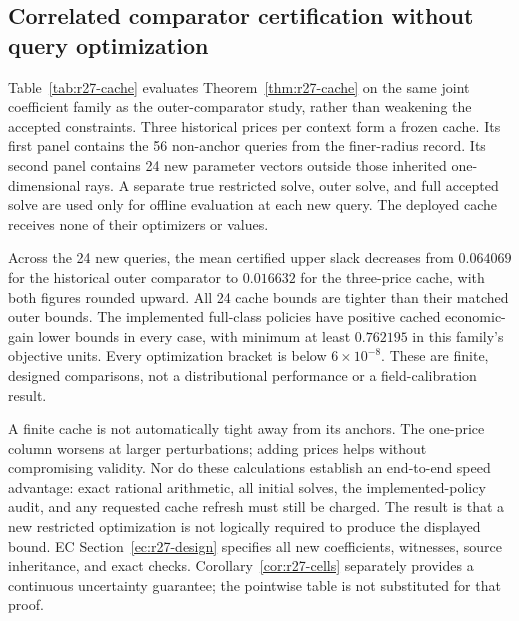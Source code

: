 \subsection{Correlated comparator certification without query optimization}
Table~\ref{tab:r27-cache} evaluates Theorem~\ref{thm:r27-cache} on the same joint coefficient family as the outer-comparator study, rather than weakening the accepted constraints. Three historical prices per context form a frozen cache. Its first panel contains the 56 non-anchor queries from the finer-radius record. Its second panel contains 24 new parameter vectors outside those inherited one-dimensional rays. A separate true restricted solve, outer solve, and full accepted solve are used only for offline evaluation at each new query. The deployed cache receives none of their optimizers or values.

Across the 24 new queries, the mean certified upper slack decreases from $0.064069$ for the historical outer comparator to $0.016632$ for the three-price cache, with both figures rounded upward. All 24 cache bounds are tighter than their matched outer bounds. The implemented full-class policies have positive cached economic-gain lower bounds in every case, with minimum at least $0.762195$ in this family's objective units. Every optimization bracket is below $6\times10^{-8}$. These are finite, designed comparisons, not a distributional performance or a field-calibration result.

A finite cache is not automatically tight away from its anchors. The one-price column worsens at larger perturbations; adding prices helps without compromising validity. Nor do these calculations establish an end-to-end speed advantage: exact rational arithmetic, all initial solves, the implemented-policy audit, and any requested cache refresh must still be charged. The result is that a new restricted optimization is not logically required to produce the displayed bound. EC Section~\ref{ec:r27-design} specifies all new coefficients, witnesses, source inheritance, and exact checks. Corollary~\ref{cor:r27-cells} separately provides a continuous uncertainty guarantee; the pointwise table is not substituted for that proof.

